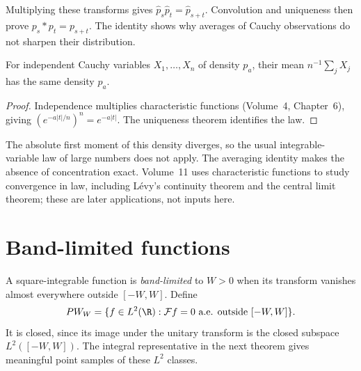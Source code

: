 Multiplying these transforms gives $\hat p_s\hat p_t=\hat p_{s+t}$. Convolution and uniqueness then prove $p_s*p_t=p_{s+t}$. The identity shows why averages of Cauchy observations do not sharpen their distribution.

\begin{corollary}\label{cor:cauchymean}
For independent Cauchy variables $X_1,\ldots,X_n$ of density $p_a$, their mean $n^{-1}\sum_jX_j$ has the same density $p_a$.
\end{corollary}
\begin{proof}
Independence multiplies characteristic functions (Volume~4, Chapter~6), giving $(e^{-a|t|/n})^n=e^{-a|t|}$. The uniqueness theorem identifies the law.
\end{proof}

The absolute first moment of this density diverges, so the usual integrable-variable law of large numbers does not apply. The averaging identity makes the absence of concentration exact. Volume~11 uses characteristic functions to study convergence in law, including L\'evy's continuity theorem and the central limit theorem; these are later applications, not inputs here.

\section{Band-limited functions}

A square-integrable function is \emph{band-limited} to $W>0$ when its transform vanishes almost everywhere outside $[-W,W]$. Define
\[
PW_W=\{f\in L^2(\R):\mathcal Ff=0\text{ a.e. outside }[-W,W]\}.
\]
It is closed, since its image under the unitary transform is the closed subspace $L^2([-W,W])$. The integral representative in the next theorem gives meaningful point samples of these $L^2$ classes.

